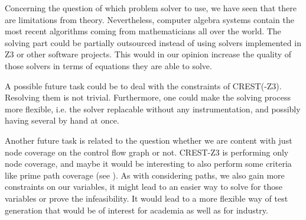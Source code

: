 \documentclass[oribibl, twocolumn]{llncs}
\begin{document}
Concerning the question of which problem solver to use, we have seen that there are limitations from theory. Nevertheless, computer algebra systems contain the most recent algorithms coming from mathematicians all over the world. The solving part could be partially outsourced instead of using solvers implemented in \textsc{Z3} or other software projects. This would in our opinion increase the quality of those solvers in terms of equations they are able to solve.

A possible future task could be to deal with the constraints of \textsc{CREST(-Z3)}. Resolving them is not trivial. Furthermore, one could make the solving process more flexible, i.e. the solver replacable without any instrumentation, and possibly having several by hand at once.

Another future task is related to the question whether we are content with just node coverage on the control flow graph or not. \textsc{CREST-Z3} is performing only node coverage, and maybe it would be interesting to also perform some criteria like prime path coverage (see \cite{ammann2008introduction}). As with considering paths, we also gain more constraints on our variables, it might lead to an easier way to solve for those variables or prove the infeasibility. It would lead to a more flexible way of test generation that would be of interest for academia as well as for industry.





\end{document}
